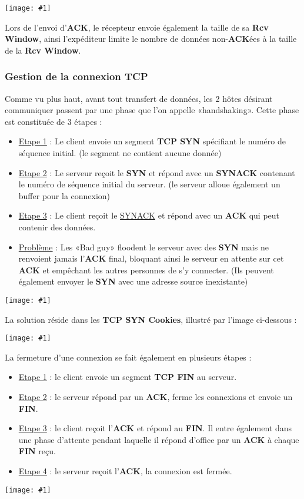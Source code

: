 \documentclass{article}
\newcommand{\imgR}[2]{\begin{center}\texttt{[image: \#1]}\end{center}}
\newcommand{\imgRT}[2]{\begin{center}\texttt{[image: \#1]}\end{center}}
\begin{document}
\imgR{CN_052.png}{250}

Lors de l'envoi d'\textbf{ACK}, le récepteur envoie également la taille de sa \textbf{Rcv Window}, ainsi 
l'expéditeur limite le nombre de données non-\textbf{ACK}ées à la taille de la \textbf{Rcv Window}.

\subsubsection{Gestion de la connexion TCP}

Comme vu plus haut, avant tout transfert de données, les 2 hôtes désirant communiquer passent par une phase que
l'on appelle «handshaking». Cette phase est constituée de 3 étapes :
\begin{multicols}{2}
\begin{itemize}
\item \underline{Etape 1} : Le client envoie un segment \textbf{TCP SYN} spécifiant le numéro de séquence 
initial. (le segment ne contient aucune donnée) 
\item \underline{Etape 2} : Le serveur reçoit le \textbf{SYN} et répond avec un \textbf{SYNACK} contenant le 
numéro de séquence initial du serveur. (le serveur alloue également un buffer pour la connexion)
\item \underline{Etape 3} : Le client reçoit le \underline{SYNACK} et répond avec un \textbf{ACK} qui peut 
contenir des données.
\item \underline{Problème} : Les «Bad guy» floodent le serveur avec des \textbf{SYN} mais ne renvoient jamais 
l'\textbf{ACK} final, bloquant ainsi le serveur en attente sur cet \textbf{ACK} et empêchant les autres 
personnes de s'y connecter. (Ils peuvent également envoyer le \textbf{SYN} avec une adresse source inexistante)
\end{itemize}
\imgRT{CN_053.png}{200}
\end{multicols}
\newpage
La solution réside dans les \textbf{TCP SYN Cookies}, illustré par l'image ci-dessous : 

\imgRT{CN_054.png}{200}

La fermeture d'une connexion se fait également en plusieurs étapes : 
\begin{multicols}{2}
\begin{itemize}
\item \underline{Etape 1} : le client envoie un segment \textbf{TCP FIN} au serveur. \\
\item \underline{Etape 2} : le serveur répond par un \textbf{ACK}, ferme les connexions et envoie un 
\textbf{FIN}. \\
\item \underline{Etape 3} : le client reçoit l'\textbf{ACK} et répond au \textbf{FIN}. Il entre également dans
une phase d'attente pendant laquelle il répond d'office par un \textbf{ACK} à chaque \textbf{FIN} reçu. \\
\item \underline{Etape 4} : le serveur reçoit l'\textbf{ACK}, la connexion est fermée.
\end{itemize}
\imgRT{CN_055.png}{200}
\end{multicols}
\end{document}
